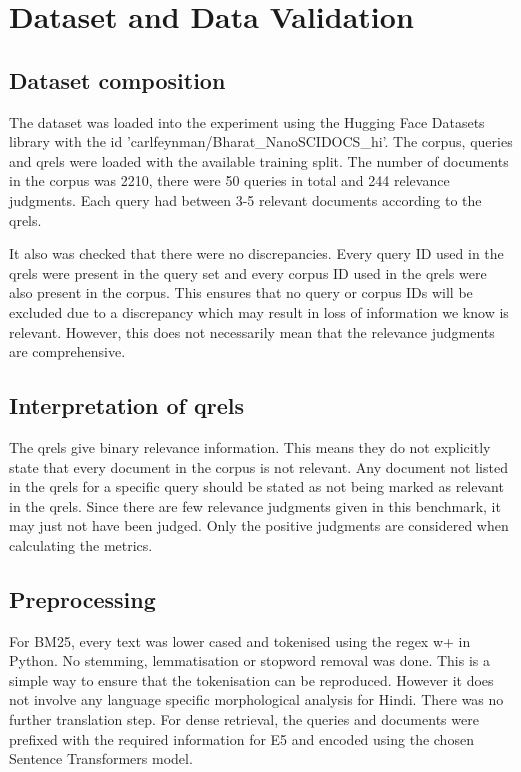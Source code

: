 \documentclass[10pt]{article}
\begin{document}
\section{Dataset and Data Validation}
\subsection{Dataset composition}
The dataset was loaded into the experiment using the Hugging Face Datasets library with the id 'carlfeynman/Bharat\_NanoSCIDOCS\_hi'. The corpus, queries and qrels were loaded with the available training split. The number of documents in the corpus was 2210, there were 50 queries in total and 244 relevance judgments. Each query had between 3-5 relevant documents according to the qrels.

It also was checked that there were no discrepancies. Every query ID used in the qrels were present in the query set and every corpus ID used in the qrels were also present in the corpus. This ensures that no query or corpus IDs will be excluded due to a discrepancy which may result in loss of information we know is relevant. However, this does not necessarily mean that the relevance judgments are comprehensive.

\subsection{Interpretation of qrels}
The qrels give binary relevance information. This means they do not explicitly state that every document in the corpus is not relevant. Any document not listed in the qrels for a specific query should be stated as not being marked as relevant in the qrels. Since there are few relevance judgments given in this benchmark, it may just not have been judged. Only the positive judgments are considered when calculating the metrics.

\subsection{Preprocessing}
For BM25, every text was lower cased and tokenised using the regex w+ in Python. No stemming, lemmatisation or stopword removal was done. This is a simple way to ensure that the tokenisation can be reproduced. However it does not involve any language specific morphological analysis for Hindi. There was no further translation step. For dense retrieval, the queries and documents were prefixed with the required information for E5 and encoded using the chosen Sentence Transformers model.
\end{document}
